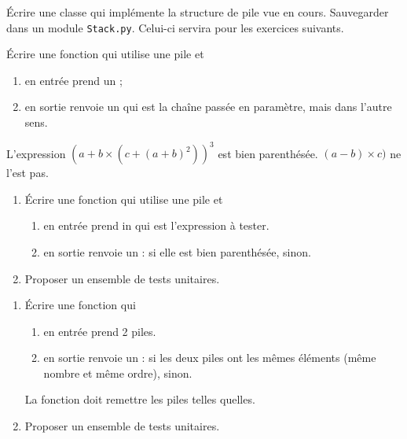 \documentclass[a4paper,12pt,french]{article}
\begin{document}

\begin{exercice}
	\'Ecrire une classe  qui implémente la structure de pile vue en cours. Sauvegarder dans un module \texttt{Stack.py}. Celui-ci servira pour les exercices suivants.
\end{exercice}

\begin{exercice}
\'Ecrire une fonction  qui utilise une pile et
\begin{enumerate}[--]
	\item 	en entrée prend un ;
	\item 	en sortie renvoie un  qui est la chaîne passée en paramètre, mais dans l'autre sens.	
\end{enumerate}
\end{exercice}

\begin{exercice}
L'expression $(a+b\times(c+(a+b)^2))^3$ est bien parenthésée. $(a-b)\times c)$ ne l'est pas.
\begin{enumerate}[\bfseries 1.]
	\item 	\'Ecrire une fonction  qui utilise une pile et
	\begin{enumerate}[--]
		\item 	en entrée prend in  qui est l'expression à tester.
		\item 	en sortie renvoie un  :  si elle est bien parenthésée,  sinon.
	\end{enumerate}
	\item 	Proposer un ensemble de tests unitaires.	
\end{enumerate}
\end{exercice}

\begin{exercice}
	\begin{enumerate}[\bfseries 1.]
		\item 	\'Ecrire une fonction  qui
		\begin{enumerate}[--]
			\item 	en entrée prend 2 piles.
			\item 	en sortie renvoie un  :  si les deux piles ont les mêmes éléments (même nombre et même ordre),  sinon.
		\end{enumerate}
		La fonction doit remettre les piles telles quelles.
	\item 	Proposer un ensemble de tests unitaires.	
	\end{enumerate}

\end{exercice}
\end{document}
